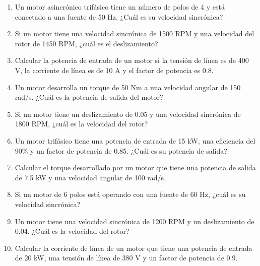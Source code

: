 \documentclass[../main]{subfiles}
\begin{document}
\begin{enumerate}
    \item Un motor asincrónico trifásico tiene un número de polos de 4 y está conectado a una fuente de 50 Hz. ¿Cuál es su velocidad sincrónica?
    \item Si un motor tiene una velocidad sincrónica de 1500 RPM y una velocidad del rotor de 1450 RPM, ¿cuál es el deslizamiento?
    \item Calcular la potencia de entrada de un motor si la tensión de línea es de 400 V, la corriente de línea es de 10 A y el factor de potencia es 0.8.
    \item Un motor desarrolla un torque de 50 Nm a una velocidad angular de 150 rad/s. ¿Cuál es la potencia de salida del motor?
    \item Si un motor tiene un deslizamiento de 0.05 y una velocidad sincrónica de 1800 RPM, ¿cuál es la velocidad del rotor?
    \item Un motor trifásico tiene una potencia de entrada de 15 kW, una eficiencia del 90\% y un factor de potencia de 0.85. ¿Cuál es su potencia de salida?
    \item Calcular el torque desarrollado por un motor que tiene una potencia de salida de 7.5 kW y una velocidad angular de 100 rad/s.
    \item Si un motor de 6 polos está operando con una fuente de 60 Hz, ¿cuál es su velocidad sincrónica?
    \item Un motor tiene una velocidad sincrónica de 1200 RPM y un deslizamiento de 0.04. ¿Cuál es la velocidad del rotor?
    \item Calcular la corriente de línea de un motor que tiene una potencia de entrada de 20 kW, una tensión de línea de 380 V y un factor de potencia de 0.9.
\end{enumerate}
\end{document}
